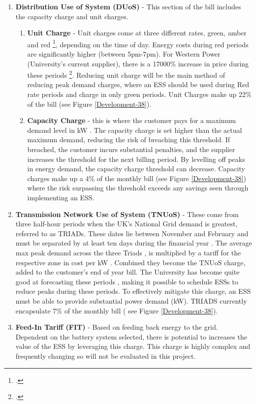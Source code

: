 \begin{enumerate}
\item \textbf{Distribution Use of System (DUoS)} - This section of the bill includes the capacity charge and unit charges.
\begin{enumerate}
\item \textbf{Unit Charge} - Unit charges come at three different rates, green, amber and red \footcite[See page 27 of][]{SWEB201492:online}, depending on the time of day. Energy costs during red periods are significantly higher (between 5pm-7pm). For Western Power (University's current supplier), there is a 17000\% increase in price during these periods \footcite[25.405 p/kWh in red periods against 0.147p/kWh in green periods][]{SWEB201492:online}. Reducing unit charge will be the main method of reducing peak demand charges, where an ESS should be used during Red rate periods and charge in only green periods. Unit Charges make up 22\% of the bill  (see Figure \ref{Development-38}).
\item \textbf{Capacity Charge} - this is where the customer pays for a maximum demand level in kW \cite{Deconstr52:online}. The capacity charge is set higher than the actual maximum demand, reducing the risk of breaching this threshold. If breached, the customer incurs substantial penalties, and the supplier increases the threshold for the next billing period. By levelling off peaks in energy demand, the capacity charge threshold can decrease. Capacity charges make up a 4\% of the monthly bill  (see Figure \ref{Development-38}) where the risk surpassing the threshold exceeds any savings seen through implementing an ESS.
\end{enumerate}
\item \textbf{Transmission Network Use of System (TNUoS)} - These come from three half-hour periods when the UK's National Grid demand is greatest, referred to as TRIADs. These dates lie between November and February and must be separated by at least ten days during the financial year \cite{TriadsWh7:online}. The average max peak demand across the three Triads \cite{TNUoSTra99:online}, is multiplied by a tariff for the respective zone in cost per kW \cite{TNUoScha93:online}. Combined they become the TNUoS charge, added to the customer's end of year bill. The University has become quite good at forecasting these periods \cite{Jbrentmeet}, making it possible to schedule ESSs to reduce peaks during these periods. To effectively mitigate this charge, an ESS must be able to provide substantial power demand (kW). TRIADS currently encapsulate 7\% of the monthly bill ( see Figure \ref{Development-38}).
\item \textbf{Feed-In Tariff (FIT)} - Based on feeding back energy to the grid. Dependent on the battery system selected, there is potential to increases the value of the ESS by leveraging this charge. This charge is highly complex and frequently changing so will not be evaluated in this project.
\end{enumerate}


